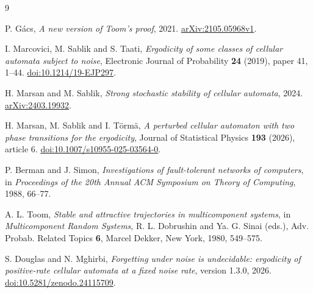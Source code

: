 \documentclass[11pt]{article}
\theoremstyle{plain}
\theoremstyle{definition}
\theoremstyle{remark}
\begin{document}
\begin{thebibliography}{9}\raggedright
{}
P. G\'acs, \emph{A new version of Toom's proof}, 2021.
\href{https://arxiv.org/abs/2105.05968v1}{arXiv:2105.05968v1}.

I. Marcovici, M. Sablik and S. Taati,
\emph{Ergodicity of some classes of cellular automata subject to noise},
Electronic Journal of Probability \textbf{24} (2019), paper 41, 1--44.
\href{https://doi.org/10.1214/19-EJP297}{doi:10.1214/19-EJP297}.

H. Marsan and M. Sablik, \emph{Strong stochastic stability of cellular automata}, 2024.
\href{https://arxiv.org/abs/2403.19932}{arXiv:2403.19932}.

H. Marsan, M. Sablik and I. T\"orm\"a,
\emph{A perturbed cellular automaton with two phase transitions for the ergodicity},
Journal of Statistical Physics \textbf{193} (2026), article 6.
\href{https://doi.org/10.1007/s10955-025-03564-0}{doi:10.1007/s10955-025-03564-0}.

P. Berman and J. Simon, \emph{Investigations of fault-tolerant networks of computers},
in \emph{Proceedings of the 20th Annual ACM Symposium on Theory of Computing}, 1988, 66--77.

A. L. Toom, \emph{Stable and attractive trajectories in multicomponent systems},
in \emph{Multicomponent Random Systems}, R. L. Dobrushin and Ya. G. Sinai (eds.),
Adv. Probab. Related Topics \textbf{6}, Marcel Dekker, New York, 1980, 549--575.

S. Douglas and N. Mghirbi, \emph{Forgetting under noise is undecidable:
ergodicity of positive-rate cellular automata at a fixed noise rate},
version 1.3.0, 2026.
\href{https://doi.org/10.5281/zenodo.24115709}{doi:10.5281/zenodo.24115709}.
\end{thebibliography}
\end{document}
